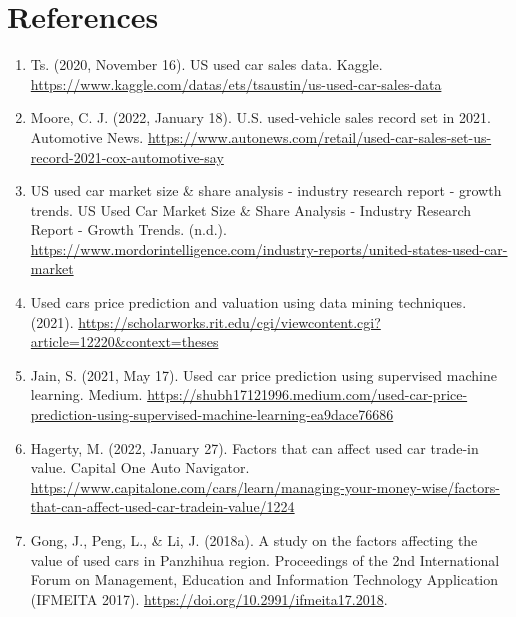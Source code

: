 \documentclass[UTF8]{ctexart}
\begin{document}
    \section{References}
    \begin{enumerate}
        \item Ts. (2020, November 16). US used car sales data. Kaggle. \newline
        \url{https://www.kaggle.com/datas/ets/tsaustin/us-used-car-sales-data}

        \item Moore, C. J. (2022, January 18). U.S. used-vehicle sales record set in 2021. Automotive News. \url{https://www.autonews.com/retail/used-car-sales-set-us-record-2021-cox-automotive-say}

        \item US used car market size & share analysis - industry research report - growth trends. US Used Car Market Size & Share Analysis - Industry Research Report - Growth Trends. (n.d.). \newline
        \url{https://www.mordorintelligence.com/industry-reports/united-states-used-car-market}

        \item Used cars price prediction and valuation using data mining techniques. (2021).\newline
        \url{https://scholarworks.rit.edu/cgi/viewcontent.cgi?article=12220&context=theses}

        \item Jain, S. (2021, May 17). Used car price prediction using supervised machine learning. Medium. \url{https://shubh17121996.medium.com/used-car-price-prediction-using-supervised-machine-learning-ea9dace76686}

        \item Hagerty, M. (2022, January 27). Factors that can affect used car trade-in value. Capital One Auto Navigator. \url{https://www.capitalone.com/cars/learn/managing-your-money-wise/factors-that-can-affect-used-car-tradein-value/1224}

        \item Gong, J., Peng, L., & Li, J. (2018a). A study on the factors affecting the value of used cars in Panzhihua region. Proceedings of the 2nd International Forum on Management, Education and Information Technology Application (IFMEITA 2017). \url{https://doi.org/10.2991/ifmeita17.2018}.
    \end{enumerate}
\end{document}
